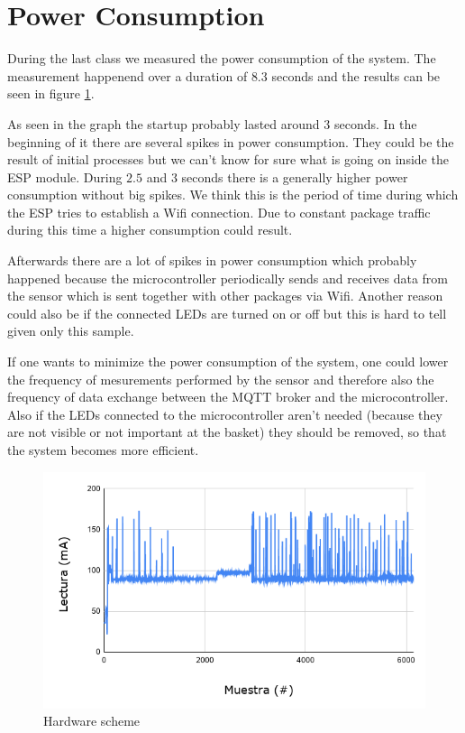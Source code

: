 \documentclass{article}
\begin{document}
\section{Power Consumption}
During the last class we measured the power consumption of the system. The
measurement happenend over a duration of $8.3$ seconds and the results can be
seen in figure \ref{chart_power}.\par
As seen in the graph the startup probably lasted around 3 seconds. In the
beginning of it there are several spikes in power consumption. They could be the
result of initial processes but we can't know for sure what is going on inside
the ESP module. During $2.5$ and $3$ seconds there is a generally higher power
consumption without big spikes. We think this is the period of time during which
the ESP tries to establish a Wifi connection. Due to constant package traffic
during this time a higher consumption could result.\par
Afterwards there are a lot of spikes in power consumption which probably
happened because the microcontroller periodically sends and receives data from
the sensor which is sent together with other packages via Wifi. Another reason
could also be if the connected LEDs are turned on or off but this is hard to
tell given only this sample.\par
If one wants to minimize the power consumption of the system, one could lower
the frequency of mesurements performed by the sensor and therefore also the
frequency of data exchange between the MQTT broker and the microcontroller. Also
if the LEDs connected to the microcontroller aren't needed (because they are not
visible or not important at the basket) they should be removed, so that the
system becomes more efficient.

\begin{figure}[]
	\centering \includegraphics[scale=0.5]{images/chart.png}
	\caption{Hardware scheme}
	\label{chart_power}
\end{figure}
\end{document}
